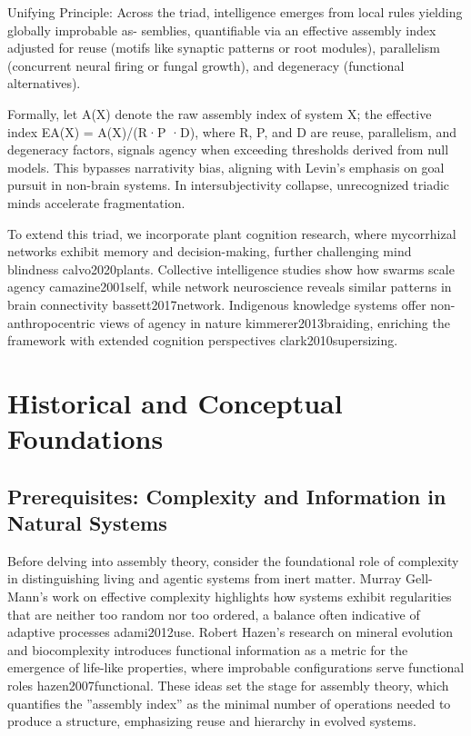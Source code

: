 \documentclass{article}
\begin{document}
Unifying Principle: Across the triad, intelligence emerges from local rules yielding globally improbable as-
semblies, quantifiable via an effective assembly index adjusted for reuse (motifs like synaptic patterns or root
modules), parallelism (concurrent neural firing or fungal growth), and degeneracy (functional alternatives).

Formally, let A(X) denote the raw assembly index of system X; the effective index EA(X) = A(X)/(R·P ·D),
where R, P, and D are reuse, parallelism, and degeneracy factors, signals agency when exceeding thresholds
derived from null models. This bypasses narrativity bias, aligning with Levin’s emphasis on goal pursuit in
non-brain systems. In intersubjectivity collapse, unrecognized triadic minds accelerate fragmentation.

To extend this triad, we incorporate plant cognition research, where mycorrhizal networks exhibit memory and decision-making, further challenging mind blindness {calvo2020plants}. Collective intelligence studies show how swarms scale agency {camazine2001self}, while network neuroscience reveals similar patterns in brain connectivity {bassett2017network}. Indigenous knowledge systems offer non-anthropocentric views of agency in nature {kimmerer2013braiding}, enriching the framework with extended cognition perspectives {clark2010supersizing}.

\section{Historical and Conceptual Foundations}
\label{sec:foundations}

\subsection{Prerequisites: Complexity and Information in Natural Systems}
Before delving into assembly theory, consider the foundational role of complexity in distinguishing living
and agentic systems from inert matter. Murray Gell-Mann’s work on effective complexity highlights how
systems exhibit regularities that are neither too random nor too ordered, a balance often indicative of
adaptive processes {adami2012use}. Robert Hazen’s research on mineral evolution and biocomplexity introduces functional
information as a metric for the emergence of life-like properties, where improbable configurations serve
functional roles {hazen2007functional}. These ideas set the stage for assembly theory, which quantifies the ”assembly index”
as the minimal number of operations needed to produce a structure, emphasizing reuse and hierarchy in
evolved systems.
\end{document}
